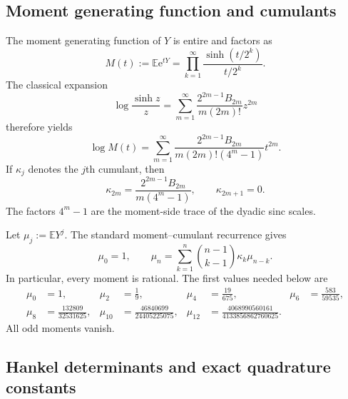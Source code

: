 \documentclass[11pt]{article}
\numberwithin{equation}{section}
\theoremstyle{definition}
\theoremstyle{remark}
\newcommand{\E}{\mathbb E}
\newcommand{\e}{\mathrm e}
\begin{document}
\subsection{Moment generating function and cumulants}

The moment generating function of $Y$ is entire and factors as
\begin{equation}
 M(t):=\E\e^{tY}
 =\prod_{k=1}^{\infty}\frac{\sinh(t/2^k)}{t/2^k}.
 \label{p1:eq:MGF}
\end{equation}
The classical expansion
\begin{equation}
 \log\frac{\sinh z}{z}
 =\sum_{m=1}^{\infty}
 \frac{2^{2m-1}B_{2m}}{m(2m)!}z^{2m}
 \label{p1:eq:logsinh}
\end{equation}
therefore yields
\begin{equation}
 \boxed{
 \log M(t)=\sum_{m=1}^{\infty}
 \frac{2^{2m-1}B_{2m}}{m(2m)!(4^m-1)}t^{2m}.}
 \label{p1:eq:logM}
\end{equation}
If $\kappa_j$ denotes the $j$th cumulant, then
\begin{equation}
 \boxed{
 \kappa_{2m}=\frac{2^{2m-1}B_{2m}}{m(4^m-1)},
 \qquad
 \kappa_{2m+1}=0.}
 \label{p1:eq:cumulants}
\end{equation}
The factors $4^m-1$ are the moment-side trace of the dyadic sinc scales.

Let $\mu_j:=\E Y^j$.  The standard moment--cumulant recurrence gives
\begin{equation}
 \mu_0=1,
 \qquad
 \mu_n=\sum_{k=1}^{n}\binom{n-1}{k-1}\kappa_k\mu_{n-k}.
 \label{p1:eq:moment-recurrence}
\end{equation}
In particular, every moment is rational.  The first values needed below are
\begin{align}
 \mu_0&=1,&
 \mu_2&=\frac19,&
 \mu_4&=\frac{19}{675},&
 \mu_6&=\frac{583}{59535},\label{p1:eq:moments-low}\\
 \mu_8&=\frac{132809}{32531625},&
 \mu_{10}&=\frac{46840699}{24405225075},&
 \mu_{12}&=\frac{4068990560161}{4133856862760625}.\nonumber
\end{align}
All odd moments vanish.

\subsection{Hankel determinants and exact quadrature constants}
\end{document}
